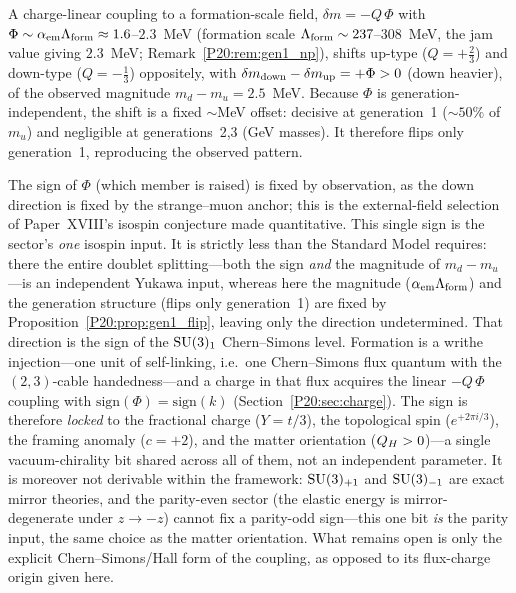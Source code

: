 \begin{proposition}
\label{P20:prop:gen1_flip}
A charge-linear coupling to a formation-scale field,
$\delta m=-Q\,\Phi$ with $\Phi\sim\alpha_{\mathrm{em}}\Lambda_{\rm form}
\approx1.6$--$2.3$~MeV (formation scale $\Lambda_{\rm form}\sim237$--$308$~MeV,
the jam value giving $2.3$~MeV; Remark~\ref{P20:rem:gen1_np}), shifts up-type
($Q=+\tfrac23$) and down-type ($Q=-\tfrac13$) oppositely, with
$\delta m_{\rm down}-\delta m_{\rm up}=+\Phi>0$ (down heavier), of the observed
magnitude $m_d-m_u=2.5$~MeV.
Because $\Phi$ is generation-independent, the shift is a fixed
$\sim$MeV offset: decisive at generation~1 ($\sim50\%$ of $m_u$) and
negligible at generations~2,3 (GeV masses). It therefore flips only
generation~1, reproducing the observed pattern.
\end{proposition}

\begin{remark}
\label{P20:rem:gen1_sign}
The sign of $\Phi$ (which member is raised) is fixed by observation, as
the down direction is fixed by the strange--muon anchor; this is the
external-field selection of Paper~XVIII's isospin conjecture
made quantitative. This single sign is the sector's \emph{one} isospin
input. It is strictly less than the Standard Model requires: there the
entire doublet splitting---both the sign \emph{and} the magnitude of
$m_d-m_u$---is an independent Yukawa input, whereas here the magnitude
($\alpha_{\mathrm{em}}\Lambda_{\rm form}$) and the generation structure (flips only
generation~1) are fixed by Proposition~\ref{P20:prop:gen1_flip}, leaving
only the direction undetermined. That direction is the sign of the
$\mathrm{SU}(3)_1$ Chern--Simons level. Formation is a writhe injection---one unit
of self-linking, i.e.\ one Chern--Simons flux quantum with the $(2,3)$-cable
handedness---and a charge in that flux acquires the linear $-Q\,\Phi$
coupling with $\mathrm{sign}(\Phi)=\mathrm{sign}(k)$
(Section~\ref{P20:sec:charge}). The sign is therefore \emph{locked} to the
fractional charge ($Y=t/3$), the topological spin ($e^{+2\pi i/3}$), the
framing anomaly ($c=+2$), and the matter orientation ($Q_H>0$)---a single
vacuum-chirality bit shared across all of them, not an independent
parameter. It is moreover not derivable within the framework: $\mathrm{SU}(3)_{+1}$
and $\mathrm{SU}(3)_{-1}$ are exact mirror theories, and the parity-even sector (the
elastic energy is mirror-degenerate under $z\to-z$) cannot fix a parity-odd
sign---this one bit \emph{is} the parity input, the same choice as the
matter orientation. What remains open is only the explicit Chern--Simons/Hall
form of the coupling, as opposed to its flux-charge origin given here.
\end{remark}

